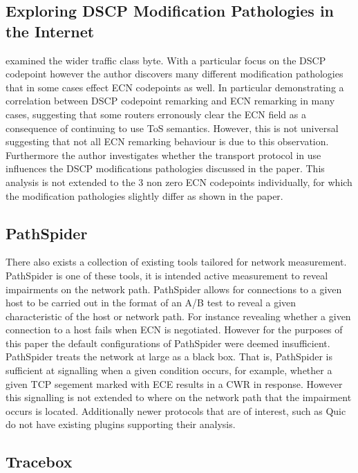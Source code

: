 \documentclass{l4proj}
\begin{document}
\subsection{Exploring DSCP Modification Pathologies in the Internet}

\cite{custura_exploring_2017} examined the wider traffic class byte. With a particular focus on the DSCP codepoint however the author discovers many different modification pathologies that in some cases effect ECN codepoints as well. In particular demonstrating a correlation between DSCP codepoint remarking and ECN remarking in many cases, suggesting that some routers erronously clear the ECN field as a consequence of continuing to use ToS semantics. However, this is not universal suggesting that not all ECN remarking behaviour is due to this observation. Furthermore the author investigates whether the transport protocol in use influences the DSCP modifications pathologies discussed in the paper. This analysis is not extended to the 3 non zero ECN codepoints individually, for which the modification pathologies slightly differ as shown in the paper.

\subsection{PathSpider}

There also exists a collection of existing tools tailored for network measurement. PathSpider is one of these tools, it is intended active measurement to reveal impairments on the network path. PathSpider allows for connections to a given host to be carried out in the format of an A/B test to reveal a given characteristic of the host or network path. For instance revealing whether a given connection to a host fails when ECN is negotiated. However for the purposes of this paper the default configurations of PathSpider were deemed insufficient. PathSpider treats the network at large as a black box. That is, PathSpider is sufficient at signalling when a given condition occurs, for example, whether a given TCP segement marked with ECE results in a CWR in response. However this signalling is not extended to where on the network path that the impairment occurs is located. Additionally newer protocols that are of interest, such as Quic do not have existing plugins supporting their analysis.

\subsection{Tracebox}
\end{document}
